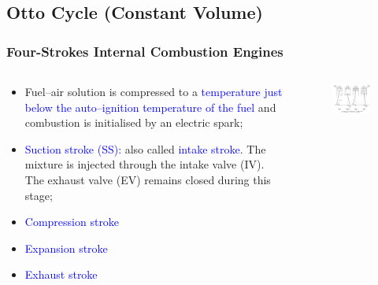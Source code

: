 \documentclass[10pt,compress]{beamer}
\begin{document}
\subsection{Otto Cycle (Constant Volume)}
\begin{frame}
 \frametitle{Four-Strokes Internal Combustion Engines}
  \begin{columns}
   \begin{column}[c]{0.4\linewidth}
    \begin{itemize}
     \item <1-> Fuel--air solution is compressed to a \textcolor{blue}{temperature just below the auto--ignition temperature of the fuel} and combustion is initialised by an electric spark;
     \item <2-> \textcolor{blue}{Suction stroke (SS):} also called \textcolor{blue}{intake stroke}. The mixture is injected through the intake valve (IV). The exhaust valve (EV) remains closed during this stage;
     \item <3-> \textcolor{blue}{Compression stroke} 
     \item <3-> \textcolor{blue}{Expansion stroke} 
     \item <3-> \textcolor{blue}{Exhaust stroke} 
    \end{itemize}
   \end{column}
   \begin{column}[c]{0.6\linewidth}
    \begin{figure}%
     \begin{center}
      \includegraphics[width=7.5cm,clip]{./Pics/InternalCombustion_4Strokes_Otto}
     \end{center}
    \end{figure}  
   \end{column}  
  \end{columns}
\end{frame}
\end{document}

